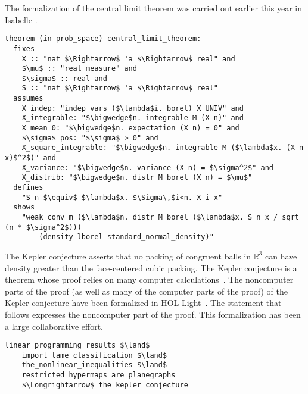 \documentclass[brochure,english,12pt]{bourbaki}
\theoremstyle{plain}
\def\ring#1{{\mathbb{#1}}}
\begin{document}
The formalization of the central limit theorem was carried out earlier this year in Isabelle \cite{avigad2014central}.

\begin{lstlisting}[keepspaces=true,stringstyle=\tt,basicstyle=\small,frame=single,framesep=8pt,mathescape,morekeywords={theorem,fixes,assumes,defines,shows,Variable,Theorem,Proof,Qed},columns=flexible]
theorem (in prob_space) central_limit_theorem:
  fixes 
    X :: "nat $\Rightarrow$ 'a $\Rightarrow$ real" and
    $\mu$ :: "real measure" and
    $\sigma$ :: real and
    S :: "nat $\Rightarrow$ 'a $\Rightarrow$ real"
  assumes
    X_indep: "indep_vars ($\lambda$i. borel) X UNIV" and
    X_integrable: "$\bigwedge$n. integrable M (X n)" and
    X_mean_0: "$\bigwedge$n. expectation (X n) = 0" and
    $\sigma$_pos: "$\sigma$ > 0" and
    X_square_integrable: "$\bigwedge$n. integrable M ($\lambda$x. (X n x)$^2$)" and
    X_variance: "$\bigwedge$n. variance (X n) = $\sigma^2$" and
    X_distrib: "$\bigwedge$n. distr M borel (X n) = $\mu$"
  defines
    "S n $\equiv$ $\lambda$x. $\Sigma\,$i<n. X i x"
  shows
    "weak_conv_m ($\lambda$n. distr M borel ($\lambda$x. S n x / sqrt (n * $\sigma^2$))) 
        (density lborel standard_normal_density)"
\end{lstlisting}



The Kepler conjecture asserts that no packing of congruent balls in $\ring{R}^3$ can have density greater than
the face-centered cubic packing.  The Kepler conjecture is a theorem 
whose proof relies on many computer
calculations~\cite{Hales:2006:DCG}.  The noncomputer parts of the proof (as well as many of the computer parts of the proof) of the Kepler conjecture 
have been formalized in HOL Light~\cite{website:FlyspeckProject}.  
The statement that follows expresses the noncomputer part of the proof.
This formalization has been a large collaborative effort.

\begin{lstlisting}[keepspaces=true,stringstyle=\tt,basicstyle=\small,frame=single,framesep=8pt,framextopmargin=10pt,mathescape,morekeywords={Variable,Theorem,Proof,Qed},columns=flexible]
    linear_programming_results $\land$      
    import_tame_classification $\land$      
    the_nonlinear_inequalities $\land$
    restricted_hypermaps_are_planegraphs    
    $\Longrightarrow$ the_kepler_conjecture
\end{lstlisting}
\end{document}
